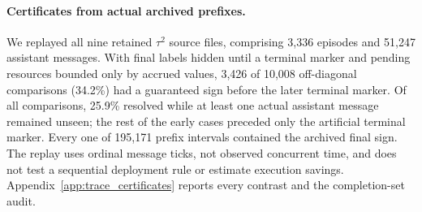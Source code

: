 \paragraph{Certificates from actual archived prefixes.}
We replayed all nine retained $\tau^2$ source files, comprising 3,336
episodes and 51,247 assistant messages. With final labels hidden until
a terminal marker and pending resources bounded only by accrued values,
3,426 of 10,008 off-diagonal comparisons (34.2\%) had a guaranteed
sign before the later terminal marker. Of all comparisons, 25.9\% resolved
while at least one actual assistant message remained unseen; the rest of
the early cases preceded only the artificial terminal marker. Every
one of 195,171 prefix intervals contained the archived final sign.
The replay uses ordinal message ticks, not observed concurrent time, and
does not test a sequential deployment rule or estimate execution savings.
Appendix~\ref{app:trace_certificates} reports every contrast and the
completion-set audit.

